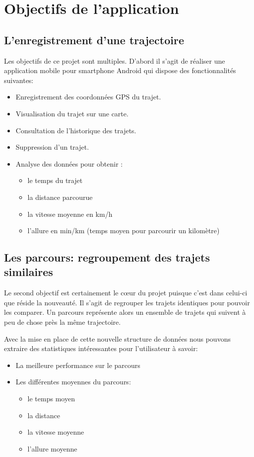 \chapter{Objectifs de l'application}
\section{L'enregistrement d'une trajectoire}
Les objectifs de ce projet sont multiples. D'abord il s'agit de réaliser une application mobile pour smartphone Android qui dispose des fonctionnalités suivantes:\bigskip

\begin{itemize}
  \item Enregistrement des coordonnées GPS du trajet.
  \item Visualisation du trajet sur une carte.
  \item Consultation de l'historique des trajets.
  \item Suppression d'un trajet.
  \item Analyse des données pour obtenir :
  \begin{itemize}
    \item le temps du trajet
    \item la distance parcourue
    \item la vitesse moyenne en km/h
    \item l'allure en min/km (temps moyen pour parcourir un kilomètre)
  \end{itemize}
\end{itemize}\bigskip

\section{Les parcours: regroupement des trajets similaires}
Le second objectif est certainement le cœur du projet puisque c'est dans celui-ci que réside la nouveauté. Il s'agit de regrouper les trajets identiques pour pouvoir les comparer. Un parcours représente alors un ensemble de trajets qui suivent à peu de chose près la même trajectoire.\bigskip

Avec la mise en place de cette nouvelle structure de données nous pouvons extraire des statistiques intéressantes pour l'utilisateur à savoir:\bigskip

\begin{itemize}
  \item La meilleure performance sur le parcours
  \item Les différentes moyennes du parcours:
  \begin{itemize}
    \item le temps moyen
    \item la distance
    \item la vitesse moyenne
    \item l'allure moyenne
  \end{itemize}   
\end{itemize}\bigskip

